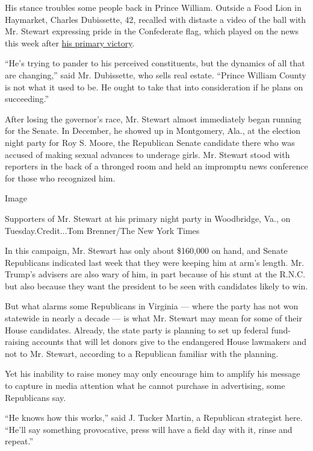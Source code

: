His stance troubles some people back in Prince William. Outside a Food
Lion in Haymarket, Charles Dubissette, 42, recalled with distaste a
video of the ball with Mr. Stewart expressing pride in the Confederate
flag, which played on the news this week after
\href{https://www.nytimes3xbfgragh.onion/elections/results/virginia-senate-primary-election}{his
primary victory}.

``He's trying to pander to his perceived constituents, but the dynamics
of all that are changing,'' said Mr. Dubissette, who sells real estate.
``Prince William County is not what it used to be. He ought to take that
into consideration if he plans on succeeding.''

After losing the governor's race, Mr. Stewart almost immediately began
running for the Senate. In December, he showed up in Montgomery, Ala.,
at the election night party for Roy S. Moore, the Republican Senate
candidate there who was accused of making sexual advances to underage
girls. Mr. Stewart stood with reporters in the back of a thronged room
and held an impromptu news conference for those who recognized him.

Image

Supporters of Mr. Stewart at his primary night party in Woodbridge, Va.,
on Tuesday.Credit...Tom Brenner/The New York Times

In this campaign, Mr. Stewart has only about \$160,000 on hand, and
Senate Republicans indicated last week that they were keeping him at
arm's length. Mr. Trump's advisers are also wary of him, in part because
of his stunt at the R.N.C. but also because they want the president to
be seen with candidates likely to win.

But what alarms some Republicans in Virginia --- where the party has not
won statewide in nearly a decade --- is what Mr. Stewart may mean for
some of their House candidates. Already, the state party is planning to
set up federal fund-raising accounts that will let donors give to the
endangered House lawmakers and not to Mr. Stewart, according to a
Republican familiar with the planning.

Yet his inability to raise money may only encourage him to amplify his
message to capture in media attention what he cannot purchase in
advertising, some Republicans say.

``He knows how this works,'' said J. Tucker Martin, a Republican
strategist here. ``He'll say something provocative, press will have a
field day with it, rinse and repeat.''

